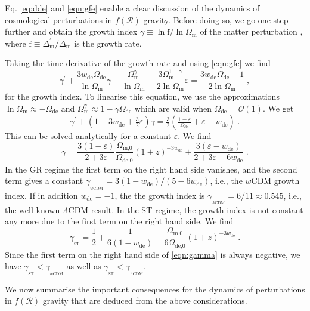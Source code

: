 \documentclass[nofootinbib,a4paper,aps,prd,10pt,superscriptaddress,reprint,showkeys,showpacs]{revtex4-1}
\newcommand{\qsubrm}[2]{{#1}_{\scriptscriptstyle{\textrm{#2}}}}
\def\be{\begin{equation}}
\def\ee{\end{equation}}
\begin{document}
Eq. \eqref{eq:dde} and \eqref{eqn:gfe} enable a clear discussion of the dynamics of cosmological perturbations in 
$f(\mathcal{R})$ gravity. Before doing so, we go one step further and obtain the growth index 
$\gamma\equiv\ln\mathrm{f}/\ln\qsubrm{\Omega}{m}$ of the matter perturbation \citep{Peebles1980}, where 
$\mathrm{f}\equiv\qsubrm{\Delta}{m}^\prime/\qsubrm{\Delta}{m}$ is the growth rate.

Taking the time derivative of the growth rate and using \eqref{eqn:gfe} we find
\be\label{eqn:ge}
 \gamma^{\prime}+ \frac{3\qsubrm{w}{de}\qsubrm{\Omega}{de}}{\ln{\qsubrm{\Omega}{m}}}\gamma+
 \frac{\qsubrm{\Omega}{m}^\gamma}{\ln{\qsubrm{\Omega}{m}}}-
 \frac{3\qsubrm{\Omega}{m}^{1-\gamma}}{2\ln{\qsubrm{\Omega}{m}}}\varepsilon=
 \frac{3\qsubrm{w}{de}\qsubrm{\Omega}{de}-1}{2\ln{\qsubrm{\Omega}{m}}}\;,
\ee
for the growth index. To linearise this equation, we use the approximations 
$\ln \qsubrm{\Omega}{m}\approx-\qsubrm{\Omega}{de}$ and $\qsubrm{\Omega}{m}^\gamma\approx1-\gamma\qsubrm{\Omega}{de}$ 
which are valid when $\qsubrm{\Omega}{de}=\mathcal{O}(1)$. We get
\be\label{eq:gp}
 \gamma^{\prime} + 
 \left(1-3\qsubrm{w}{de}+\tfrac{3}{2}\varepsilon\right)\gamma = 
 \tfrac{3}{2}\left(\tfrac{1-\varepsilon}{\qsubrm{\Omega}{de}}+\varepsilon-\qsubrm{w}{de}\right)\;.
\ee
This can be solved analytically for a constant $\varepsilon$. We find 
\be\label{eqn:gamma}
 \gamma = \frac{3(1-\varepsilon)}{2+3\varepsilon}\frac{\qsubrm{\Omega}{m,0}}{\qsubrm{\Omega}{de,0}}
          (1+z)^{-3\qsubrm{w}{de}}+\frac{3(\varepsilon-\qsubrm{w}{de})}{2+3\varepsilon-6\qsubrm{w}{de}}\;.
\ee
In the GR regime the first term on the right hand side vanishes, and the second term gives a constant 
$\gamma_{_{w\mathrm{CDM}}}=3(1-\qsubrm{w}{de})/(5-6\qsubrm{w}{de})$, i.e., the $w$CDM growth index. If in addition 
$\qsubrm{w}{de}=-1$, the the growth index is $\gamma_{_{\Lambda\mathrm{CDM}}}=6/11\approx0.545$, i.e., the well-known 
$\Lambda$CDM result. In the ST regime, the growth index is not constant any more due to the first term on the right 
hand side. We find
\be\label{eqn:gammaST}
 \gamma_{_\mathrm{ST}} = \frac{1}{2} + \frac{1}{6(1-\qsubrm{w}{de})} 
                         -\frac{\qsubrm{\Omega}{m,0}}{6\qsubrm{\Omega}{de,0}}(1+z)^{-3\qsubrm{w}{de}}\;.
\ee
Since the first term on the right hand side of \eqref{eqn:gamma} is always negative, we have 
$\gamma_{_\mathrm{ST}}<\gamma_{_{w\mathrm{CDM}}}$ as well as $\gamma_{_\mathrm{ST}}<\gamma_{_{\Lambda\mathrm{CDM}}}$.

We now summarise the important consequences for the dynamics of perturbations in $f(\mathcal{R})$ gravity that are 
deduced from the above considerations.
\end{document}
